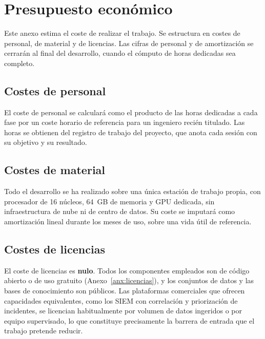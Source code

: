 \chapter{Presupuesto económico}
\label{cap:presupuesto}

Este anexo estima el coste de realizar el trabajo. Se estructura en costes de personal,
de material y de licencias. Las cifras de personal y de amortización se cerrarán al final del
desarrollo, cuando el cómputo de horas dedicadas sea completo.

\section{Costes de personal}

El coste de personal se calculará como el producto de las horas dedicadas a cada fase por un
coste horario de referencia para un ingeniero recién titulado. Las horas se obtienen del
registro de trabajo del proyecto, que anota cada sesión con su objetivo y su resultado.


\section{Costes de material}

Todo el desarrollo se ha realizado sobre una única estación de trabajo propia, con procesador
de 16 núcleos, 64~GB de memoria y GPU dedicada, sin infraestructura de nube ni de centro de
datos. Su coste se imputará como amortización lineal durante los meses de uso, sobre una vida
útil de referencia.


\section{Costes de licencias}

El coste de licencias es \textbf{nulo}. Todos los componentes empleados son de código abierto
o de uso gratuito (Anexo~\ref{anx:licencias}), y los conjuntos de datos y las bases de
conocimiento son públicos. Las plataformas comerciales que ofrecen capacidades equivalentes,
como los SIEM con correlación y priorización de incidentes, se licencian habitualmente por
volumen de datos ingeridos o por equipo supervisado, lo que constituye precisamente la barrera
de entrada que el trabajo pretende reducir.

